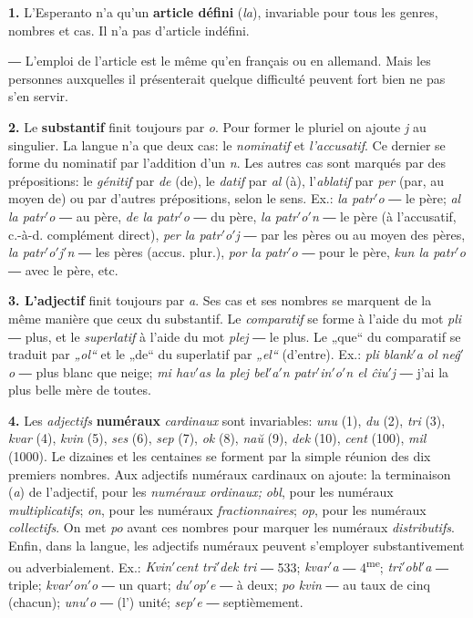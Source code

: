 \textbf{1.} L’Esperanto n’a qu’un \textbf{article défini} (\emph{la}), invariable pour tous les genres, nombres et cas. Il n’a pas d’article indéfini.

{\footnotesize {} ― L’emploi de l’article est le même qu’en français ou en allemand. Mais les personnes auxquelles il présenterait quelque difficulté peuvent fort bien ne pas s’en servir.}

\textbf{2.} Le \textbf{substantif} finit toujours par \emph{o}. Pour former le pluriel on ajoute \emph{j} au singulier. La langue n’a que deux cas: le \emph{nominatif} et \emph{l’accusatif}. Ce dernier se forme du nominatif par l’addition d’un \emph{n}. Les autres cas sont marqués par des prépositions: le \emph{génitif} par \emph{de} (de), le \emph{datif} par \emph{al} (à), l’\emph{ablatif} par \emph{per} (par, au moyen de) ou par d’autres prépositions, selon le sens. Ex.: \emph{la patr$'$o} ― le père; \emph{al la patr$'$o} ― au père, \emph{de la patr$'$o} ― du père, \emph{la patr$'$o$'$n} ― le père (à l’accusatif, c.-à-d. complément direct), \emph{per la patr$'$o$'$j} ― par les pères ou au moyen des pères, \emph{la patr$'$o$'$j$'$n} ― les pères (accus. plur.), \emph{por la patr$'$o} ― pour le père, \emph{kun la patr$'$o} ― avec le père, etc.

\textbf{3. L’adjectif} finit toujours par \emph{a}. Ses cas et ses nombres se marquent de la même manière que ceux du substantif. Le \emph{comparatif} se forme à l’aide du mot \emph{pli} ― plus, et le \emph{superlatif} à l’aide du mot \emph{plej} ― le plus. Le „que“ du comparatif se traduit par \emph{„ol“} et le „de“ du superlatif par \emph{„el“} (d’entre). Ex.: \emph{pli blank$'$a ol neĝ$'$o} ― plus blanc que neige; \emph{mi hav$'$as la plej bel$'$a$'$n patr$'$in$'$o$'$n el ĉiu$'$j} ― j’ai la plus belle mère de toutes.

\textbf{4.} Les \emph{adjectifs} \textbf{numéraux} \emph{cardinaux} sont invariables: \emph{unu} (1), \emph{du} (2), \emph{tri} (3), \emph{kvar} (4), \emph{kvin} (5), \emph{ses} (6), \emph{sep} (7), \emph{ok} (8), \emph{naŭ} (9), \emph{dek} (10), \emph{cent} (100), \emph{mil} (1000). Le dizaines et les centaines se forment par la simple réunion des dix premiers nombres. Aux adjectifs numéraux cardinaux on ajoute: la terminaison (\emph{a}) de l’adjectif, pour les \emph{numéraux ordinaux;} \emph{obl}, pour les numéraux \emph{multiplicatifs}; \emph{on}, pour les numéraux \emph{fractionnaires}; \emph{op}, pour les numéraux \emph{collectifs}. On met \emph{po} avant ces nombres pour marquer les numéraux \emph{distributifs}. Enfin, dans la langue, les adjectifs numéraux peuvent s’employer substantivement ou adverbialement. Ex.: \emph{Kvin$'$cent tri$'$dek tri} ― 533; \emph{kvar$'$a} ― 4\textsuperscript{me}; \emph{tri$'$obl$'$a} ― triple; \emph{kvar$'$on$'$o} ― un quart; \emph{du$'$op$'$e} ― à deux; \emph{po kvin} ― au taux de cinq (chacun); \emph{unu$'$o} ― (l’) unité; \emph{sep$'$e} ― septièmement.

